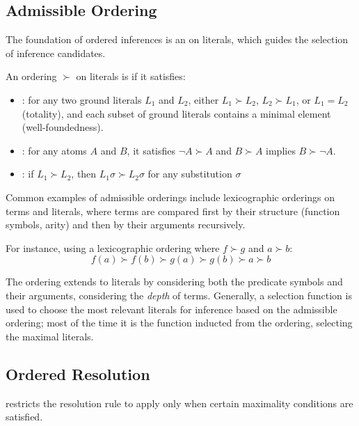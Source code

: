 \subsection{Admissible Ordering}\label{subsec:admissible-ordering}

The foundation of ordered inferences is an  on literals, which guides the selection of inference candidates.

An ordering \(\succ\) on literals is  if it satisfies:
\begin{itemize}
    \item {}: for any two ground literals \(L_1\) and \(L_2\), either \(L_1 \succ L_2\), \(L_2 \succ L_1\), or \(L_1 = L_2\) (totality), and each subset of ground literals contains a minimal element (well-foundedness).
    \item {}: for any atoms \(A\) and \(B\), it satisfies \(\neg A \succ A\) and \(B \succ A\) implies \(B \succ \neg A\).
    \item {}: if \(L_1 \succ L_2\), then \(L_1\sigma \succ L_2\sigma\) for any substitution \(\sigma\)
\end{itemize}

Common examples of admissible orderings include lexicographic orderings on terms and literals, where terms are compared first by their structure (function symbols, arity) and then by their arguments recursively.

For instance, using a lexicographic ordering where \(f \succ g\) and \(a \succ b\):
\[f(a) \succ f(b) \succ g(a) \succ g(b) \succ a \succ b\]

The ordering extends to literals by considering both the predicate symbols and their arguments, considering the \emph{depth} of terms.
Generally, a selection function is used to choose the most relevant literals for inference based on the admissible ordering; most of the time it is the function inducted from the ordering, selecting the maximal literals.

\subsection{Ordered Resolution}\label{subsec:ordered-resolution}

 restricts the resolution rule to apply only when certain maximality conditions are satisfied.

